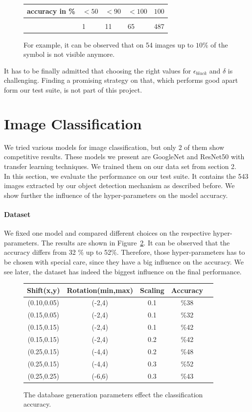 \documentclass[twocolumn]{article}
\begin{document}
\begin{figure}
\begin{tabular}{l|l l l l}
 accuracy in \%  & $<50$   & $ < 90 $ &  $ < 100$ &  $100$ \\
 \hline \\
 & 1 & 11 & 65 & 487 
\end{tabular}
\caption{For example, it can be observed that on 54 images up to $10 \%$ of the symbol is not visible anymore.}
\label{quality}
\end{figure}


It has to be finally admitted that choosing the right values for $\epsilon_{black}$ and $\delta$ is challenging. Finding a promising strategy on that, which performs good apart form our test suite, is not part of this project.  

\section{Image Classification}
We tried various models for image classification, but only 2 of them show competitive results. These models we present are GoogleNet and ResNet50 with transfer learning techniques. We trained them on our data set from section 2.\\
In this section, we evaluate the performance on our test suite. It contains the 543 images extracted by our object detection mechanism as described before. We show further the influence of the hyper-parameters on the model accuracy.

\paragraph{Dataset}
We fixed one model and compared different choices on the respective hyper-parameters. The results are shown in Figure~\ref{database_param}. It can be observed that the accuracy differs from 32 \% up to 52\%. Therefore, those hyper-parameters has to be chosen with special care, since they have a big influence on the accuracy. We see later, the dataset has indeed the biggest influence on the final performance. 

\begin{figure}
 \begin{center}
\begin{tabular}{|c|c|c|c|c|}
 \hline
 Shift(x,y)&Rotation(min,max)&Scaling&Accuracy\\
 \hline
 (0.10,0.05) & (-2,4) & 0.1 &\%38 \\
 \hline
 (0.15,0.05) & (-2,4) & 0.1 &\%32 \\
 \hline
 (0.15,0.15) & (-2,4) & 0.1&\%42 \\
  \hline
 (0.15,0.15) & (-2,4) & 0.2&\%42 \\
 \hline
 (0.25,0.15) & (-4,4) & 0.2&\%48 \\
 \hline
  (0.25,0.15) & (-4,4) & 0.3&\%52 \\
 \hline
 (0.25,0.25) & (-6,6) & 0.3&\%43 \\
 \hline
\end{tabular}
\caption{The database generation parameters effect the classification accuracy.}
\label{database_param}
\end{center}
\end{figure}
\end{document}
